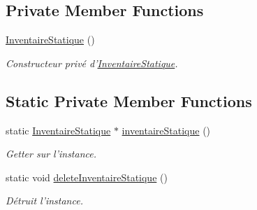 \subsection*{Private Member Functions}
\begin{DoxyCompactItemize}
\item 
\hypertarget{classPropriete_1_1InventaireStatique_a029f63355b8b1f5f2c34d49fb9d25c2a}{\hyperlink{classPropriete_1_1InventaireStatique_a029f63355b8b1f5f2c34d49fb9d25c2a}{Inventaire\-Statique} ()}\label{classPropriete_1_1InventaireStatique_a029f63355b8b1f5f2c34d49fb9d25c2a}

\begin{DoxyCompactList}\small\item\em Constructeur privé d'\hyperlink{classPropriete_1_1InventaireStatique}{Inventaire\-Statique}. \end{DoxyCompactList}\end{DoxyCompactItemize}
\subsection*{Static Private Member Functions}
\begin{DoxyCompactItemize}
\item 
\hypertarget{classPropriete_1_1InventaireStatique_a5f6e46c7694d076a8d713f77b00aee71}{static \hyperlink{classPropriete_1_1InventaireStatique}{Inventaire\-Statique} $\ast$ \hyperlink{classPropriete_1_1InventaireStatique_a5f6e46c7694d076a8d713f77b00aee71}{inventaire\-Statique} ()}\label{classPropriete_1_1InventaireStatique_a5f6e46c7694d076a8d713f77b00aee71}

\begin{DoxyCompactList}\small\item\em Getter sur l'instance. \end{DoxyCompactList}\item 
\hypertarget{classPropriete_1_1InventaireStatique_aa4b46fc24dc18179a0deea93d4bb1d95}{static void \hyperlink{classPropriete_1_1InventaireStatique_aa4b46fc24dc18179a0deea93d4bb1d95}{delete\-Inventaire\-Statique} ()}\label{classPropriete_1_1InventaireStatique_aa4b46fc24dc18179a0deea93d4bb1d95}

\begin{DoxyCompactList}\small\item\em Détruit l'instance. \end{DoxyCompactList}\end{DoxyCompactItemize}
